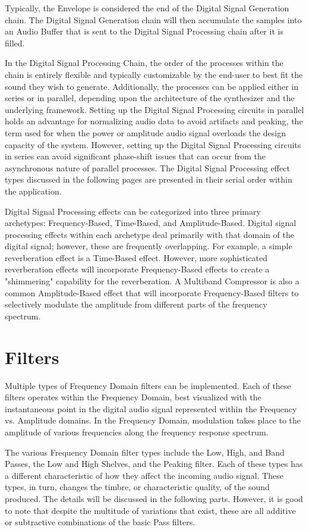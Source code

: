\documentclass[a4paper,12pt]{report}
\begin{document}
Typically, the Envelope is considered the end of the Digital Signal Generation chain. The Digital Signal Generation chain will then accumulate the samples into an Audio Buffer that is sent to the Digital Signal Processing chain after it is filled.

In the Digital Signal Processing Chain, the order of the processes within the chain is entirely flexible and typically customizable by the end-user to best fit the sound they wish to generate. Additionally, the processes can be applied either in series or in parallel, depending upon the architecture of the synthesizer and the underlying framework. Setting up the Digital Signal Processing circuits in parallel holds an advantage for normalizing audio data to avoid artifacts and peaking, the term used for when the power or amplitude audio signal overloads the design capacity of the system. However, setting up the Digital Signal Processing circuits in series can avoid significant phase-shift issues that can occur from the asynchronous nature of parallel processes. The Digital Signal Processing effect types discussed in the following pages are presented in their serial order within the application.

Digital Signal Processing effects can be categorized into three primary archetypes: Frequency-Based, Time-Based, and Amplitude-Based. Digital signal processing effects within each archetype deal primarily with that domain of the digital signal; however, these are frequently overlapping. For example, a simple reverberation effect is a Time-Based effect. However, more sophisticated reverberation effects will incorporate Frequency-Based effects to create a "shimmering" capability for the reverberation. A Multiband Compressor is also a common Amplitude-Based effect that will incorporate Frequency-Based filters to selectively modulate the amplitude from different parts of the frequency spectrum.

\section{Filters}
\label{sec:filters}
Multiple types of Frequency Domain filters can be implemented. Each of these filters operates within the Frequency Domain, best visualized with the instantaneous point in the digital audio signal represented within the Frequency vs. Amplitude domains. In the Frequency Domain, modulation takes place to the amplitude of various frequencies along the frequency response spectrum. 

The various Frequency Domain filter types include the Low, High, and Band Passes, the Low and High Shelves, and the Peaking filter. Each of these types has a different characteristic of how they affect the incoming audio signal. These types, in turn, changes the timbre, or characteristic quality, of the sound produced. The details will be discussed in the following parts. However, it is good to note that despite the multitude of variations that exist, these are all additive or subtractive combinations of the basic Pass filters.
\end{document}
